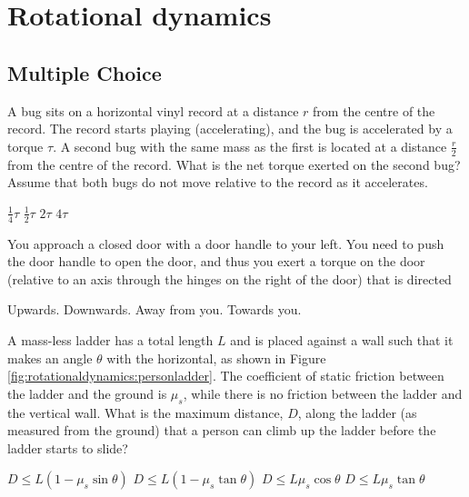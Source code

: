 \section{Rotational dynamics}

\subsection{Multiple Choice}


\question[1] A bug sits on a horizontal vinyl record at a distance $r$ from the centre of the record. The record starts playing (accelerating), and the bug is accelerated by a torque $\tau$. A second bug with the same mass as the first is located at a distance $\frac{r}{2}$ from the centre of the record. What is the net torque exerted on the second bug? Assume that both bugs do not move relative to the record as it accelerates.
\begin{checkboxes} 
	\CorrectChoice $\frac{1}{4}\tau$
	\choice  $\frac{1}{2}\tau$
	\choice $2\tau$
	\choice $4\tau$
\end{checkboxes}

\question You approach a closed door with a door handle to your left. You need to push the door handle to open the door, and thus you exert a torque on the door (relative to an axis through the hinges on the right of the door) that is directed
\begin{checkboxes} 
	\choice Upwards.
	\CorrectChoice  Downwards.
	\choice Away from you. 
	\choice Towards you.
\end{checkboxes}

\question \label{question:rotationaldynamics:personladder} A mass-less ladder has a total length $L$ and is placed against a wall such that it makes an angle $\theta$ with the horizontal, as shown in Figure \ref{fig:rotationaldynamics:personladder}. The coefficient of static friction between the ladder and the ground is $\mu_s$, while there is no friction between the ladder and the vertical wall. What is the maximum distance, $D$, along the ladder (as measured from the ground) that a person can climb up the ladder before the ladder starts to slide?
\begin{checkboxes} 
	\choice $D\leq L(1-\mu_s\sin\theta)$
	\choice $D\leq L(1-\mu_s\tan\theta)$
	\choice $D\leq L\mu_s\cos\theta$
	\CorrectChoice $D\leq L\mu_s\tan\theta$
\end{checkboxes}


